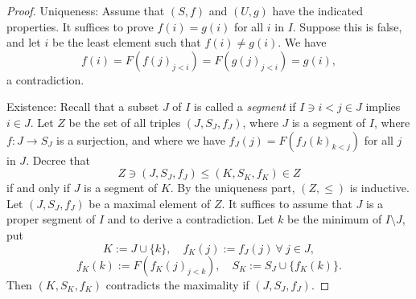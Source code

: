 \documentclass[12pt]{article}%
\theoremstyle{remark}
\theoremstyle{definition}
\begin{document}
\begin{proof}
Uniqueness: Assume that $(S,f)$ and $(U,g)$ have the indicated properties. It suffices to prove $f(i)=g(i)$ for all $i$ in $I$. Suppose this is false, and let $i$ be the least element such that $f(i)\neq g(i)$. We have 
$$
f(i)=F(f(j)_{j<i})=F(g(j)_{j<i})=g(i),
$$ 
a contradiction. 

Existence: Recall that a subset $J$ of $I$ is called a {\em segment} if $I\ni i<j\in J$ implies $i\in J$. Let $Z$ be the set of all triples $(J,S_J,f_J)$, where $J$ is a segment of $I$, where $f:J\to S_J$ is a surjection, and where we have $f_J(j)=F(f_J(k)_{k<j})$ for all $j$ in $J$. Decree that 
$$
Z\ni(J,S_J,f_J)\le(K,S_K,f_K)\in Z
$$ 
if and only if $J$ is a segment of $K$. By the uniqueness part, $(Z,\le)$ is inductive. Let $(J,S_J,f_J)$ be a maximal element of $Z$. It suffices to assume that $J$ is a proper segment of $I$ and to derive a contradiction. Let $k$ be the minimum of $I\setminus J$, put 
$$
K:=J\cup\{k\},\quad f_K(j):=f_J(j)\ \forall\ j\in J,
$$
$$
f_K(k):=F(f_K(j)_{j<k}),\quad S_K:=S_J\cup\{f_K(k)\}.
$$ 
Then $(K,S_K,f_K)$ contradicts the maximality if $(J,S_J,f_J)$. 
\end{proof}
\end{document}
